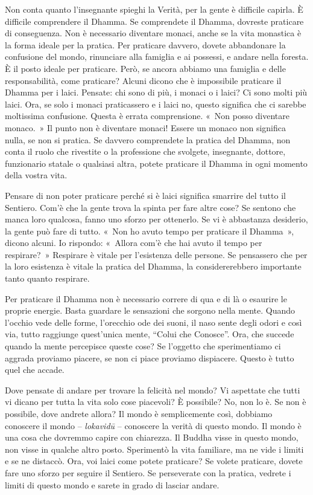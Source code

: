 Non conta quanto l'insegnante spieghi la Verità, per la gente è
difficile capirla. È difficile comprendere il Dhamma. Se comprendete il
Dhamma, dovreste praticare di conseguenza. Non è necessario diventare
monaci, anche se la vita monastica è la forma ideale per la pratica. Per
praticare davvero, dovete abbandonare la confusione del mondo,
rinunciare alla famiglia e ai possessi, e andare nella foresta. È il
posto ideale per praticare. Però, se ancora abbiamo una famiglia e delle
responsabilità, come praticare? Alcuni dicono che è impossibile
praticare il Dhamma per i laici. Pensate: chi sono di più, i monaci o i
laici? Ci sono molti più laici. Ora, se solo i monaci praticassero e i
laici no, questo significa che ci sarebbe moltissima confusione. Questa
è errata comprensione. «~Non posso diventare monaco.~» Il punto non è
diventare monaci! Essere un monaco non significa nulla, se non si
pratica. Se davvero comprendete la pratica del Dhamma, non conta il
ruolo che rivestite o la professione che svolgete, insegnante, dottore,
funzionario statale o qualsiasi altra, potete praticare il Dhamma in
ogni momento della vostra vita.

Pensare di non poter praticare perché si è laici significa smarrire del
tutto il Sentiero. Com'è che la gente trova la spinta per fare altre
cose? Se sentono che manca loro qualcosa, fanno uno sforzo per
ottenerlo. Se vi è abbastanza desiderio, la gente può fare di tutto.
«~Non ho avuto tempo per praticare il Dhamma~», dicono alcuni. Io
rispondo: «~Allora com'è che hai avuto il tempo per respirare?~»
Respirare è vitale per l'esistenza delle persone. Se pensassero che per
la loro esistenza è vitale la pratica del Dhamma, la considererebbero
importante tanto quanto respirare.

Per praticare il Dhamma non è necessario correre di qua e di là o
esaurire le proprie energie. Basta guardare le sensazioni che sorgono
nella mente. Quando l'occhio vede delle forme, l'orecchio ode dei suoni,
il naso sente degli odori e così via, tutto raggiunge quest'unica mente,
``Colui che Conosce''. Ora, che succede quando la mente percepisce
queste cose? Se l'oggetto che sperimentiamo ci aggrada proviamo piacere,
se non ci piace proviamo dispiacere. Questo è tutto quel che accade.

Dove pensate di andare per trovare la felicità nel mondo? Vi aspettate
che tutti vi dicano per tutta la vita solo cose piacevoli? È possibile?
No, non lo è. Se non è possibile, dove andrete allora? Il mondo è
semplicemente così, dobbiamo conoscere il mondo -- \emph{lokavidū} --
conoscere la verità di questo mondo. Il mondo è una cosa che dovremmo
capire con chiarezza. Il Buddha visse in questo mondo, non visse in
qualche altro posto. Sperimentò la vita familiare, ma ne vide i limiti e
se ne distaccò. Ora, voi laici come potete praticare? Se volete
praticare, dovete fare uno sforzo per seguire il Sentiero. Se
perseverate con la pratica, vedrete i limiti di questo mondo e sarete in
grado di lasciar andare.

